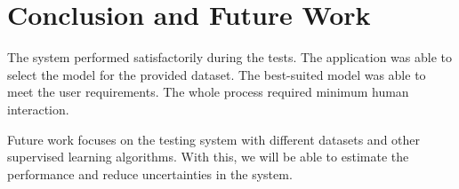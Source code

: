 \section{Conclusion and Future Work}\label{sec:conclusion_and_futur_work}

The system performed satisfactorily during the tests. The application was able to select the model for the provided dataset. The best-suited model was able to meet the user requirements. The whole process required minimum human interaction.

Future work focuses on the testing system with different datasets and other supervised learning algorithms. With this, we will be able to estimate the performance and reduce uncertainties in the system.

